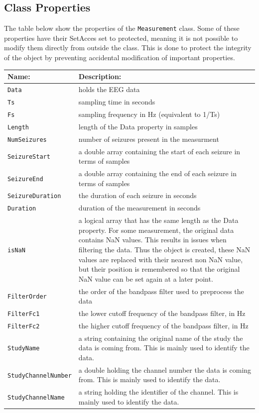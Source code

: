 \documentclass[usletter, 11pt]{extarticle}
\begin{document}
\subsection{Class Properties}

The table below show the properties of the \texttt{Measurement} class. Some of these properties have their SetAcces set to protected, meaning it is not possible to modify them directly from outside the class. This is done to protect the integrity of the object by preventing accidental modification of important properties.

\begin{center}
	\begin{tabular}{p{4cm}|p{12cm}}
	\textbf{Name:} & \textbf{Description:} \\ \hline
	\texttt{Data}& holds the EEG data \\
	\texttt{Ts}& sampling time in seconds \\
	\texttt{Fs}& sampling frequency in Hz (equivalent to 1/Ts)\\
	 \texttt{Length}& length of the Data property in samples\\
	 \texttt{NumSeizures}& number of seizures present in the measurment\\
	 \texttt{SeizureStart}& a double array containing the start of each seizure in terms of samples\\
	 \texttt{SeizureEnd}& a double array containing the end of each seizure in terms of samples\\
	 \texttt{SeizureDuration}& the duration of each seizure in seconds\\
	 \texttt{Duration}& duration of the measurement in seconds\\
	 \texttt{isNaN}& a logical array that has the same length as the Data property. For some measurement, the original data contains NaN values. This results in issues when filtering the data. Thus the object is created, these NaN values are replaced with their nearest non NaN value, but their position is remembered so that the original NaN value can be set again at a later point.\\
	 \texttt{FilterOrder}& the order of the bandpass filter used to preprocess the data\\
	 \texttt{FilterFc1}& the lower cutoff frequency of the bandpass filter, in Hz\\
	 \texttt{FilterFc2}& the higher cutoff frequency of the bandpass filter, in Hz\\
	 \texttt{StudyName}& a string containing the original name of the study the data is coming from. This is mainly used to identify the data.\\
	 \texttt{StudyChannelNumber}& a double holding the channel number the data is coming from. This is mainly used to identify the data.\\
	 \texttt{StudyChannelName}& a string holding the identifier of the channel. This is mainly used to identify the data.\\
\end{tabular}

\end{center}
\end{document}
